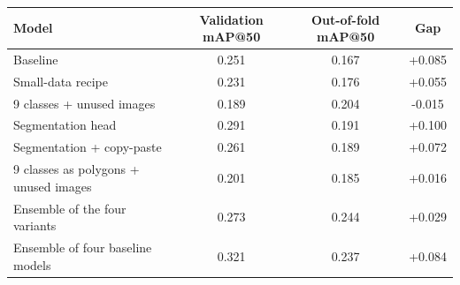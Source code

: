\begin{tabular}{lccc}
\toprule
Model & Validation mAP@50 & Out-of-fold mAP@50 & Gap \\
\midrule
Baseline & 0.251 & 0.167 & +0.085 \\
Small-data recipe & 0.231 & 0.176 & +0.055 \\
9 classes + unused images & 0.189 & 0.204 & -0.015 \\
Segmentation head & 0.291 & 0.191 & +0.100 \\
Segmentation + copy-paste & 0.261 & 0.189 & +0.072 \\
9 classes as polygons + unused images & 0.201 & 0.185 & +0.016 \\
Ensemble of the four variants & 0.273 & 0.244 & +0.029 \\
Ensemble of four baseline models & 0.321 & 0.237 & +0.084 \\
\bottomrule
\end{tabular}

